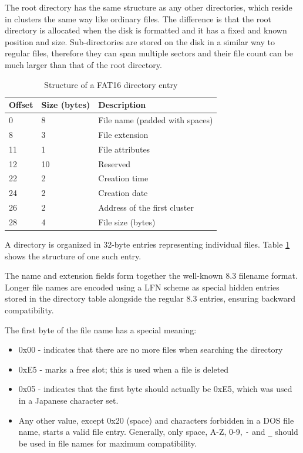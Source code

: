 The root directory has the same structure as any other directories, which reside in clusters the same way like ordinary files. The difference is that the root directory is allocated when the disk is formatted and it has a fixed and known position and size. Sub-directories are stored on the disk in a similar way to regular files, therefore they can span multiple sectors and their file count can be much larger than that of the root directory.

\begin{table}
	\centering
	\begin{tabular}{lll}
		\toprule
		\textbf{Offset} & \textbf{Size (bytes)}  & \textbf{Description}\\
		\midrule
		0 & 8 & File name (padded with spaces) \\
		8 & 3 & File extension \\
		11 & 1 & File attributes \\
		12 & 10 & Reserved \\
		22 & 2 & Creation time \\
		24 & 2 & Creation date \\
		26 & 2 & Address of the first cluster \\
		28 & 4 & File size (bytes) \\
		\bottomrule
	\end{tabular}
	\caption{\label{tab:fat16-dir-entry}Structure of a FAT16 directory entry}
\end{table}

A directory is organized in 32-byte entries representing individual files. Table \ref{tab:fat16-dir-entry} shows the structure of one such entry.

The name and extension fields form together the well-known 8.3 filename format. Longer file names are encoded using a \gls{LFN} scheme as special hidden entries stored in the directory table alongside the regular 8.3 entries, ensuring backward compatibility. 

The first byte of the file name has a special meaning:

\begin{itemize}
	\item 0x00 - indicates that there are no more files when searching the directory
	\item 0xE5 - marks a free slot; this is used when a file is deleted
	\item 0x05 - indicates that the first byte should actually be 0xE5, which was used in a Japanese character set.
	\item Any other value, except 0x20 (space) and characters forbidden in a DOS file name, starts a valid file entry. Generally, only space, A-Z, 0-9, \verb|-| and \verb|_| should be used in file names for maximum compatibility.
\end{itemize}

